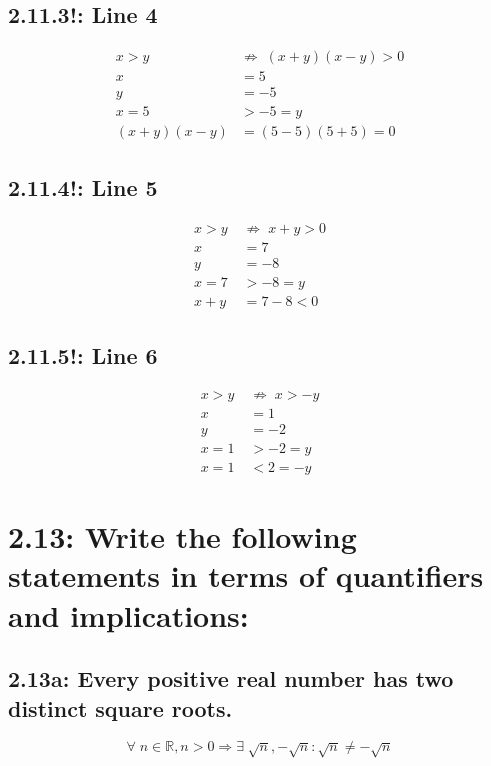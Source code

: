 \documentclass{article}
\begin{document}
\subsection*{2.11.3!: Line 4}

\begin{align*}
  x>y\;&{\not\Rightarrow}\;(x+y)(x-y)>0\\
  x&=5\\
  y&=-5\\
  x=5&>-5=y\\
  (x+y)(x-y)&=(5-5)(5+5)=0
\end{align*}

\subsection*{2.11.4!: Line 5}

\begin{align*}
  x>y\;&{\not\Rightarrow}\;x+y>0\\
  x&=7\\
  y&=-8\\
  x=7&>-8=y\\
  x+y&=7-8<0
\end{align*}

\subsection*{2.11.5!: Line 6}

\begin{align*}
  x>y\;&{\not\Rightarrow}\;x>-y\\
  x&=1\\
  y&=-2\\
  x=1&>-2=y\\
  x=1&<2=-y
\end{align*}

\section*{2.13: Write the following statements in terms of quantifiers and implications:}

\subsection*{2.13a: Every positive real number has two distinct square roots.}

\begin{equation*}
  \forall\; n\in\mathbb{R},n>0\Rightarrow\exists\;\sqrt{n},-\sqrt{n}:\sqrt{n}\neq-\sqrt{n}
\end{equation*}
\end{document}
